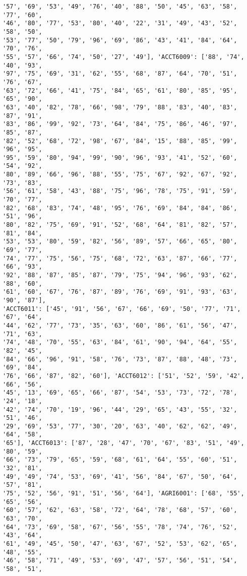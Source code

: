 \documentclass[11pt]{article}
\begin{document}
\begin{Verbatim}[commandchars=\\\{\}]
'57', '69', '53', '49', '76', '40', '88', '50', '45', '63', '58', '77', '60',
'46', '80', '77', '53', '80', '40', '22', '31', '49', '43', '52', '58', '50',
'53', '77', '50', '79', '96', '69', '86', '43', '41', '84', '64', '70', '76',
'55', '57', '66', '74', '50', '27', '49'], 'ACCT6009': ['88', '74', '40', '93',
'97', '75', '69', '31', '62', '55', '68', '87', '64', '70', '51', '76', '67',
'63', '72', '66', '41', '75', '84', '65', '61', '80', '85', '95', '65', '90',
'63', '40', '82', '78', '66', '98', '79', '88', '83', '40', '83', '87', '91',
'83', '86', '99', '92', '73', '64', '84', '75', '86', '46', '97', '85', '87',
'82', '52', '68', '72', '98', '67', '84', '15', '88', '85', '99', '96', '95',
'95', '59', '80', '94', '99', '90', '96', '93', '41', '52', '60', '54', '92',
'80', '89', '66', '96', '88', '55', '75', '67', '92', '67', '92', '73', '83',
'56', '61', '58', '43', '88', '75', '96', '78', '75', '91', '59', '70', '77',
'82', '68', '83', '74', '48', '95', '76', '69', '84', '84', '86', '51', '96',
'80', '82', '75', '69', '91', '52', '68', '64', '81', '82', '57', '81', '84',
'53', '53', '80', '59', '82', '56', '89', '57', '66', '65', '80', '69', '77',
'74', '77', '75', '56', '75', '68', '72', '63', '87', '66', '77', '66', '93',
'92', '88', '87', '85', '87', '79', '75', '94', '96', '93', '62', '88', '60',
'61', '60', '67', '76', '87', '89', '76', '69', '91', '93', '63', '90', '87'],
'ACCT6011': ['45', '91', '56', '67', '66', '69', '50', '77', '71', '67', '64',
'44', '62', '77', '73', '35', '63', '60', '86', '61', '56', '47', '71', '63',
'74', '48', '70', '55', '63', '84', '61', '90', '94', '64', '55', '82', '45',
'84', '66', '96', '91', '58', '76', '73', '87', '88', '48', '73', '69', '84',
'76', '66', '87', '82', '60'], 'ACCT6012': ['51', '52', '59', '42', '66', '56',
'45', '13', '69', '65', '66', '87', '54', '53', '73', '72', '78', '24', '18',
'42', '74', '70', '19', '96', '44', '29', '65', '43', '55', '32', '51', '46',
'29', '69', '53', '77', '30', '20', '63', '40', '62', '62', '49', '64', '58',
'65'], 'ACCT6013': ['87', '28', '47', '70', '67', '83', '51', '49', '80', '59',
'66', '73', '79', '65', '59', '68', '61', '64', '55', '60', '51', '32', '81',
'49', '49', '74', '53', '69', '41', '56', '84', '67', '50', '64', '57', '81',
'75', '52', '56', '91', '51', '56', '64'], 'AGRI6001': ['68', '55', '65', '56',
'60', '57', '62', '63', '58', '72', '64', '78', '68', '57', '60', '63', '70',
'64', '73', '69', '58', '67', '56', '55', '78', '74', '76', '52', '43', '64',
'61', '49', '45', '50', '47', '63', '67', '52', '53', '62', '65', '48', '55',
'46', '58', '71', '49', '53', '69', '47', '57', '56', '51', '54', '58', '51',

\end{Verbatim}
\end{document}
